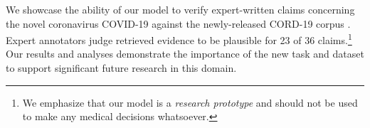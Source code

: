 We showcase the ability of our model to verify expert-written claims concerning the novel coronavirus COVID-19 against the newly-released CORD-19 corpus \cite{Wang2020CORD19TC}. Expert annotators judge retrieved evidence to be plausible for 23 of 36 claims.\footnote{We emphasize that our model is a \emph{research prototype} and should not be used to make any medical decisions whatsoever.} Our results and analyses demonstrate the importance of the new task and dataset to support significant future research in this domain.
